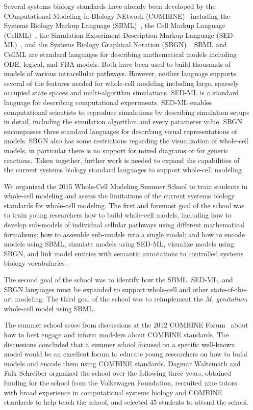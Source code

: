 \documentclass[journal,transmag]{IEEEtran}
\begin{document}
Several systems biology standards have already been developed by the COmputational Modeling in BIology NEtwork (COMBINE)~\cite{le2011meeting} including the Systems Biology Markup Language (SBML)~\cite{hucka2003}, the Cell Markup Language (CellML)~\cite{hedley_2001b}, the Simulation Experiment Description Markup Language (SED-ML)~\cite{sedml2011}, and the Systems Biology Graphical Notation (SBGN)~\cite{LeNovereHMMSS09}. SBML and CellML are standard languages for describing mathematical models including ODE, logical, and FBA models. Both have been used to build thousands of models of various intracellular pathways. 
However, neither language supports several of the features needed for whole-cell modeling including large, sparsely occupied state spaces and multi-algorithm simulations. 
SED-ML is a standard language for describing computational experiments. SED-ML enables computational scientists to reproduce simulations by describing simulation setups in detail, including the simulation algorithm and every parameter value. 
SBGN encompasses three standard languages for describing visual representations of models. SBGN also has some restrictions regarding the visualization of whole-cell models, in particular there is no support for mixed diagrams or for generic reactions.
Taken together, further work is needed to expand the capabilities of the current systems biology standard languages to support whole-cell modeling.

We organized the 2015 Whole-Cell Modeling Summer School to train students in whole-cell modeling and assess the limitations of the current systems biology standards for whole-cell modeling. 
The first and foremost goal of the school was to train young researchers how to build whole-cell models, including how to develop sub-models of individual cellular pathways using different mathematical formalisms; how to assemble sub-models into a single model; and how to encode models using SBML, simulate models using SED-ML, visualize models using SBGN, and link model entities with semantic annotations to controlled systems biology vocabularies \cite{courtot2011a}. 

The second goal of the school was to identify how the SBML, SED-ML, and SBGN languages must be expanded to support whole-cell and other state-of-the-art modeling.
The third goal of the school was to reimplement the \textit{M. genitalium} whole-cell model using SBML.

The summer school arose from discussions at the 2012 COMBINE Forum~\cite{COMBINE2012} about how to best engage and inform modelers about COMBINE standards. The discussions concluded that a summer school focused on a specific well-known model would be an excellent forum to educate young researchers on how to build models and encode them using COMBINE standards. Dagmar Waltemath and Falk Schreiber organized the school over the following three years, obtained funding for the school from the Volkswagen Foundation, recruited nine tutors with broad experience in computational systems biology and COMBINE standards to help teach the school, and selected 45 students to attend the school.
\end{document}

